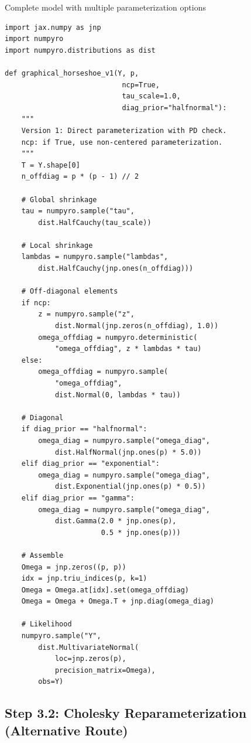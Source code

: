 \documentclass[11pt,a4paper]{article}
\begin{document}
\begin{code}{Complete model with multiple parameterization options}
\begin{lstlisting}
import jax.numpy as jnp
import numpyro
import numpyro.distributions as dist

def graphical_horseshoe_v1(Y, p,
                            ncp=True,
                            tau_scale=1.0,
                            diag_prior="halfnormal"):
    """
    Version 1: Direct parameterization with PD check.
    ncp: if True, use non-centered parameterization.
    """
    T = Y.shape[0]
    n_offdiag = p * (p - 1) // 2

    # Global shrinkage
    tau = numpyro.sample("tau",
        dist.HalfCauchy(tau_scale))

    # Local shrinkage
    lambdas = numpyro.sample("lambdas",
        dist.HalfCauchy(jnp.ones(n_offdiag)))

    # Off-diagonal elements
    if ncp:
        z = numpyro.sample("z",
            dist.Normal(jnp.zeros(n_offdiag), 1.0))
        omega_offdiag = numpyro.deterministic(
            "omega_offdiag", z * lambdas * tau)
    else:
        omega_offdiag = numpyro.sample(
            "omega_offdiag",
            dist.Normal(0, lambdas * tau))

    # Diagonal
    if diag_prior == "halfnormal":
        omega_diag = numpyro.sample("omega_diag",
            dist.HalfNormal(jnp.ones(p) * 5.0))
    elif diag_prior == "exponential":
        omega_diag = numpyro.sample("omega_diag",
            dist.Exponential(jnp.ones(p) * 0.5))
    elif diag_prior == "gamma":
        omega_diag = numpyro.sample("omega_diag",
            dist.Gamma(2.0 * jnp.ones(p),
                       0.5 * jnp.ones(p)))

    # Assemble
    Omega = jnp.zeros((p, p))
    idx = jnp.triu_indices(p, k=1)
    Omega = Omega.at[idx].set(omega_offdiag)
    Omega = Omega + Omega.T + jnp.diag(omega_diag)

    # Likelihood
    numpyro.sample("Y",
        dist.MultivariateNormal(
            loc=jnp.zeros(p),
            precision_matrix=Omega),
        obs=Y)
\end{lstlisting}
\end{code}

\subsection{Step 3.2: Cholesky Reparameterization (Alternative Route)}
\end{document}
